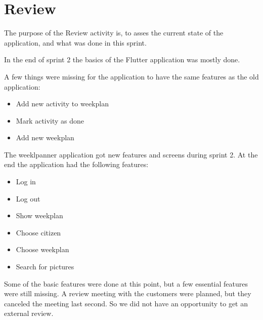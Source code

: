 \section{Review}

The purpose of the Review activity is, to asses the current state of the application, and what was done in this sprint.

In the end of sprint 2 the basics of the Flutter application was mostly done.

A few things were missing for the application to have the same features as the old application:
\begin{itemize}
    \item Add new activity to weekplan
    \item Mark activity as done
    \item Add new weekplan
\end{itemize}

The weeklpanner application got new features and screens during sprint 2. At the end the application had the following features:
\begin{itemize}
    \item Log in
    \item Log out
    \item Show weekplan 
    \item Choose citizen
    \item Choose weekplan
    \item Search for pictures
\end{itemize}

Some of the basic features were done at this point, but a few essential features were still missing. 
A review meeting with the customers were planned, but they canceled the meeting last second. So we did not have an opportunity  to get an external review.
